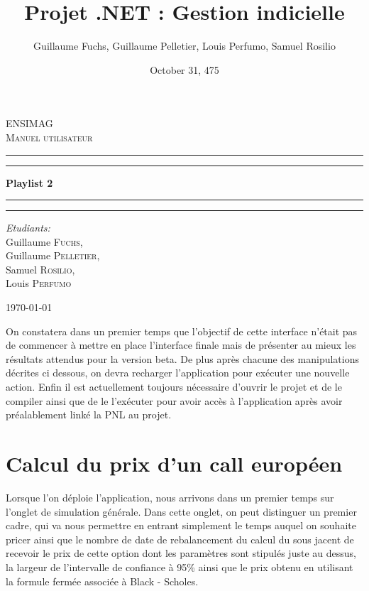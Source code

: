 \documentclass[french,12pt,a4paper]{article}
\title{Projet .NET : Gestion indicielle}
\date{October 31, 475}
\author{Guillaume Fuchs, Guillaume Pelletier, Louis Perfumo, Samuel Rosilio}
\begin{document}
\begin{titlepage}
\begin{center}

\textsc{\LARGE ENSIMAG}\\[1.5cm]

\textsc{\Large Manuel utilisateur}\\[0.5cm]

 \hrule
 \hrule 

\vspace{7mm}
{ \huge \bfseries Playlist 2  }

\vspace{7mm}
\hrule
\hrule

\vspace{7mm}
\begin{minipage}{0.4\textwidth}
\begin{flushleft} \large
\emph{Etudiants:}\\
Guillaume \textsc{Fuchs},\\
Guillaume \textsc{Pelletier},\\
Samuel \textsc{Rosilio},\\
Louis \textsc{Perfumo}
\end{flushleft}
\end{minipage}

\vfill

{\large \today}

\end{center}
\end{titlepage}
\newpage

On constatera dans un premier temps que l'objectif de cette interface n'était pas de commencer à mettre en place l'interface finale mais de présenter au mieux les résultats attendus pour la version beta. De plus après chacune des manipulations décrites ci dessous, on devra recharger l'application pour exécuter une nouvelle action. Enfin il est actuellement toujours nécessaire d'ouvrir le projet et de le compiler ainsi que de le l'exécuter pour avoir accès à l'application après avoir préalablement linké la PNL au projet.

\section{Calcul du prix d'un call européen}

\indent Lorsque l'on déploie l'application, nous arrivons dans un premier temps sur l'onglet de simulation générale. Dans cette onglet, on peut distinguer un premier cadre, qui va nous permettre en entrant simplement le temps auquel on souhaite pricer ainsi que le nombre de date de rebalancement du calcul du sous jacent de recevoir le prix de cette option dont les paramètres sont stipulés juste au dessus, la largeur de l'intervalle de confiance à 95\% ainsi que le prix obtenu en utilisant la formule fermée associée à Black - Scholes.
\end{document}
